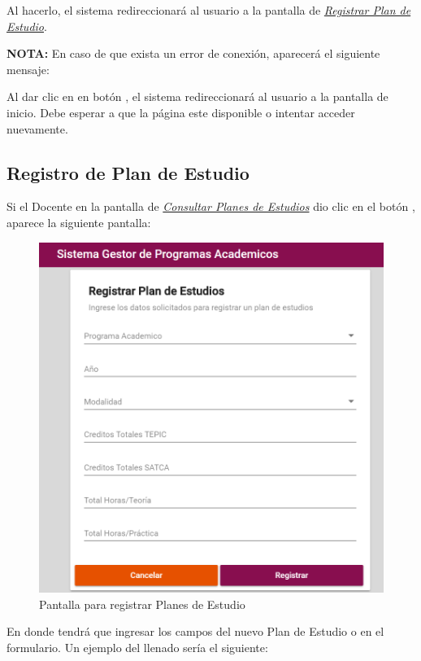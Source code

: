 Al hacerlo, el sistema redireccionará al usuario a la pantalla de \hyperlink{registrarPE}{\textit{Registrar Plan de Estudio}}.


\textbf{NOTA:} En caso de que exista un error de conexión, aparecerá el siguiente mensaje:

Al dar clic en en botón , el sistema redireccionará al usuario a la pantalla de inicio. Debe esperar a que la página este disponible o intentar acceder nuevamente.
\newpage
\subsection{Registro de Plan de Estudio}
Si el Docente en la pantalla de \hyperlink{consultarPE}{\textit{Consultar Planes de Estudios}} dio clic en el botón \IUbutton{+}, aparece la siguiente pantalla:

\begin{figure}[!hbtp]
    \centering
    \hypertarget{registrarPE}{\includegraphics[width=0.7\linewidth]{images/SP4-GPE/registrarPE}}
    \caption{Pantalla para registrar Planes de Estudio}
    \label{registrarPE}
\end{figure}
\newpage
En donde tendrá que ingresar los campos del nuevo Plan de Estudio o en el formulario. Un ejemplo del llenado sería el siguiente:

